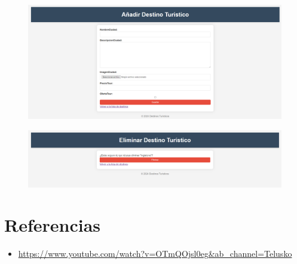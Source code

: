 \documentclass{article}
\begin{document}
	\begin{figure}[H]
		\centering
		\includegraphics[width=1.0\textwidth, keepaspectratio]{img/pagina3}
	\end{figure}
	
	\begin{figure}[H]
		\centering
		\includegraphics[width=1.0\textwidth, keepaspectratio]{img/pagina4}
	\end{figure}
	
	
	
	
	\clearpage
	
	\section{Referencias}
	\begin{itemize}			
		\item \url{https://www.youtube.com/watch?v=OTmQOjsl0eg&ab_channel=Telusko}
	\end{itemize}	
	
	
\end{document}
